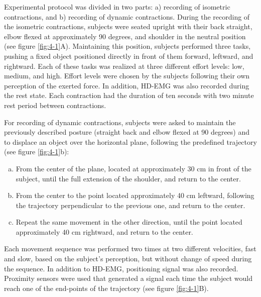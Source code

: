 Experimental protocol was divided in two parts: a) recording of isometric contractions, and b) recording of dynamic contractions.
During the recording of the isometric contractions, subjects were seated upright with their back straight, elbow flexed at approximately 90 degrees, and shoulder in the neutral position (see figure \ref{fig:4-1}A). Maintaining this position, subjects performed three tasks, pushing a fixed object positioned directly in front of them forward, leftward, and rightward. Each of these tasks was realized at three different effort levels: low, medium, and high. Effort levels were chosen by the subjects following their own perception of the exerted force. In addition, HD-EMG was also recorded during the rest state. Each contraction had the duration of ten seconds with two minute rest period between contractions.

For recording of dynamic contractions, subjects were asked to maintain the previously described posture (straight back and elbow flexed at 90 degrees) and to displace an object over the horizontal plane, following the predefined trajectory (see figure \ref{fig:4-1}b):

\begin{enumerate}[a)]
\item From the center of the plane, located at approximately 30 cm in front of the subject, until the full extension of the shoulder, and return to the center.
\item From the center to the point located approximately 40 cm leftward, following the trajectory perpendicular to the previous one, and return to the center.
\item Repeat the same movement in the other direction, until the point located approximately 40 cm rightward, and return to the center.
\end{enumerate}

Each movement sequence was performed two times at two different velocities, fast and slow, based on the subject's perception, but without change of speed during the sequence. In addition to HD-EMG, positioning signal was also recorded. Proximity sensors were used that generated a signal each time the subject would reach one of the end-points of the trajectory (see figure \ref{fig:4-1}B).

